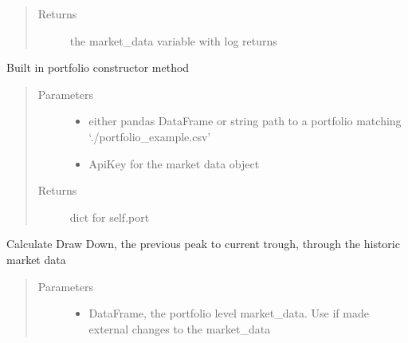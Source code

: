 \documentclass[letterpaper,10pt,english]{sphinxmanual}
\begin{document}
\begin{fulllineitems}
\begin{fulllineitems}
\begin{quote}
\begin{description}
\item[{Returns}] \leavevmode
the market\_data variable with log returns

\end{description}\end{quote}

\end{fulllineitems}


\begin{fulllineitems}
\label{\detokenize{securities:risk_dash.securities.Portfolio.construct_portfolio_csv}}
Built in portfolio constructor method
\begin{quote}\begin{description}
\item[{Parameters}] \leavevmode\begin{itemize}
\item {} 
 \textendash{} either pandas DataFrame or string path to a portfolio matching ‘./portfolio\_example.csv’

\item {} 
 \textendash{} ApiKey for the market data object

\end{itemize}

\item[{Returns}] \leavevmode
dict for self.port

\end{description}\end{quote}

\end{fulllineitems}


\begin{fulllineitems}
\label{\detokenize{securities:risk_dash.securities.Portfolio.drawdown}}
Calculate Draw Down, the previous peak to current trough, through the historic market data
\begin{quote}\begin{description}
\item[{Parameters}] \leavevmode\begin{itemize}
\item {} 
 \textendash{} DataFrame, the portfolio level market\_data. Use if made external changes to the market\_data


\end{itemize}
\end{description}
\end{quote}
\end{fulllineitems}
\end{fulllineitems}
\end{document}
